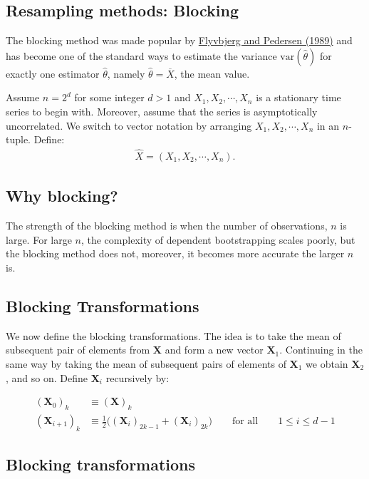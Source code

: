 \documentclass[%
oneside,                 %
final,                   %
10pt]{article}
\begin{document}
\subsection*{Resampling methods: Blocking}

The blocking method was made popular by \href{{https://aip.scitation.org/doi/10.1063/1.457480}}{Flyvbjerg and Pedersen (1989)}
and has become one of the standard ways to estimate the variance
$\mathrm{var}(\widehat{\theta})$ for exactly one estimator $\widehat{\theta}$, namely
$\widehat{\theta} = \overline{X}$, the mean value. 

Assume $n = 2^d$ for some integer $d>1$ and $X_1,X_2,\cdots, X_n$ is a stationary time series to begin with. 
Moreover, assume that the series is asymptotically uncorrelated. We switch to vector notation by arranging $X_1,X_2,\cdots,X_n$ in an $n$-tuple. Define:
\begin{align*}
\hat{X} = (X_1,X_2,\cdots,X_n).
\end{align*}

\subsection*{Why blocking?}

The strength of the blocking method is when the number of
observations, $n$ is large. For large $n$, the complexity of dependent
bootstrapping scales poorly, but the blocking method does not,
moreover, it becomes more accurate the larger $n$ is.

\subsection*{Blocking Transformations}
 We now define the blocking transformations. The idea is to take the mean of subsequent
pair of elements from $\bm{X}$ and form a new vector
$\bm{X}_1$. Continuing in the same way by taking the mean of
subsequent pairs of elements of $\bm{X}_1$ we obtain $\bm{X}_2$, and
so on. 
Define $\bm{X}_i$ recursively by:

\begin{align} 
(\bm{X}_0)_k &\equiv (\bm{X})_k \nonumber \\
(\bm{X}_{i+1})_k &\equiv \frac{1}{2}\Big( (\bm{X}_i)_{2k-1} +
(\bm{X}_i)_{2k} \Big) \qquad \text{for all} \qquad 1 \leq i \leq d-1
\end{align} 

\subsection*{Blocking transformations}
\end{document}
